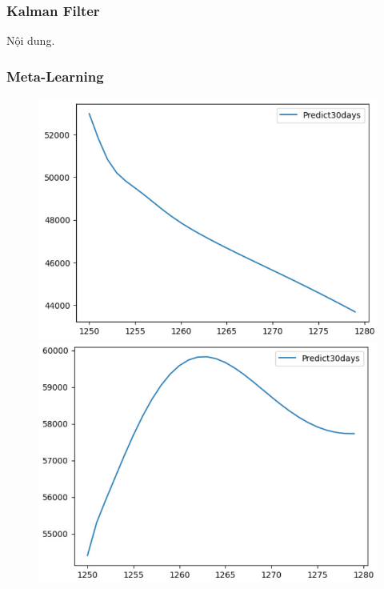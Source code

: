 \subsubsection{Kalman Filter}
Nội dung.





\subsubsection{Meta-Learning}
\begin{figure}[H]
    \centering
    \begin{minipage}{0.15\textwidth}
    \centering
    \includegraphics[width=1\textwidth]{resources/chapter-5/predicted/BIDV_LSTM_7_3_next30days.jpg}
    \end{minipage}
    \hfill
    \begin{minipage}{0.15\textwidth}
    \centering
    \includegraphics[width=1\textwidth]{resources/chapter-5/predicted/BIDV_LSTM_8_2_next30days.jpg}

\end{minipage}
\end{figure}

